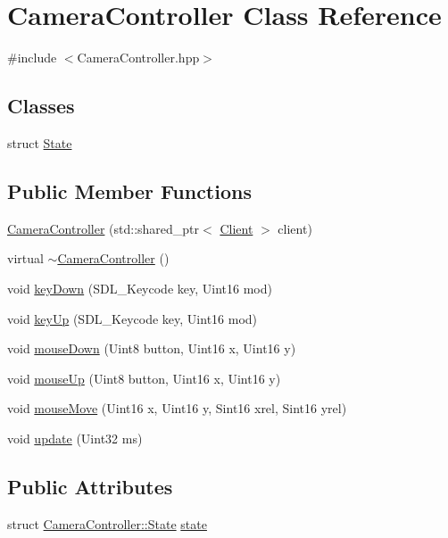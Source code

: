 \hypertarget{classCameraController}{\section{Camera\-Controller Class Reference}
\label{classCameraController}
}


{\ttfamily \#include $<$Camera\-Controller.\-hpp$>$}

\subsection*{Classes}
\begin{DoxyCompactItemize}
\item 
struct \hyperlink{structCameraController_1_1State}{State}
\end{DoxyCompactItemize}
\subsection*{Public Member Functions}
\begin{DoxyCompactItemize}
\item 
\hyperlink{classCameraController_aa5b94b46134533f0642ac9066f25687a}{Camera\-Controller} (std\-::shared\-\_\-ptr$<$ \hyperlink{classClient}{Client} $>$ client)
\item 
virtual \hyperlink{classCameraController_a9ecb9436179d1436803822196cd949e6}{$\sim$\-Camera\-Controller} ()
\item 
void \hyperlink{classCameraController_ac48129e3dccdc40b033d07bcccc0dbe1}{key\-Down} (S\-D\-L\-\_\-\-Keycode key, Uint16 mod)
\item 
void \hyperlink{classCameraController_ada5ef30f510a74f8316b4557030cb26d}{key\-Up} (S\-D\-L\-\_\-\-Keycode key, Uint16 mod)
\item 
void \hyperlink{classCameraController_ad09efd0619d4ffad8e746e665008f738}{mouse\-Down} (Uint8 button, Uint16 x, Uint16 y)
\item 
void \hyperlink{classCameraController_aa56a3e8df0584d46e4473b2be74b80dc}{mouse\-Up} (Uint8 button, Uint16 x, Uint16 y)
\item 
void \hyperlink{classCameraController_a4671639fc356b2911d3b83380aa0e57e}{mouse\-Move} (Uint16 x, Uint16 y, Sint16 xrel, Sint16 yrel)
\item 
void \hyperlink{classCameraController_ac7e4f5bf0264294c2b0a108dd4e6db96}{update} (Uint32 ms)
\end{DoxyCompactItemize}
\subsection*{Public Attributes}
\begin{DoxyCompactItemize}
\item 
struct \hyperlink{structCameraController_1_1State}{Camera\-Controller\-::\-State} \hyperlink{classCameraController_a371d94e117888f0a4d512f8577cea4a5}{state}
\end{DoxyCompactItemize}


